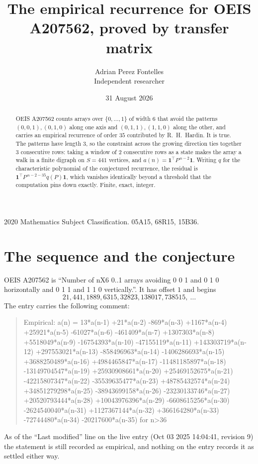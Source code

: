\documentclass[11pt,a4paper]{article}
\title{The empirical recurrence for OEIS A207562, proved by transfer matrix}
\author{Adrian Perez Fontelles\\ \small Independent researcher}
\date{31 August 2026}
\theoremstyle{plain}
\theoremstyle{definition}
\begin{document}
\maketitle

\begin{abstract}
OEIS A207562 counts arrays over $\{0,\dots,1\}$ of width $6$ that avoid the patterns
$(0,0,1), (0,1,0)$ along one axis and $(0,1,1), (1,1,0)$ along the other, and carries an empirical recurrence of
order $35$ contributed by R.~H.~Hardin. It is true. The patterns have length $3$, so
the constraint across the growing direction ties together $3$ consecutive rows: taking a
window of $2$ consecutive rows as a state makes the array a walk in a finite digraph
on $S=441$ vertices, and $a(n)=\mathbf{1}^{\!\top}P^{\,n-2}\mathbf{1}$. Writing $q$
for the characteristic polynomial of the conjectured recurrence, the residual is
$\mathbf{1}^{\!\top}P^{\,n-2-35}q(P)\mathbf{1}$, which vanishes identically
beyond a threshold that the computation pins down exactly. Finite, exact, integer.
\end{abstract}

\noindent\small 2020 Mathematics Subject Classification. 05A15, 68R15, 15B36.\normalsize

\section{The sequence and the conjecture}

OEIS A207562 is ``Number of nX6 0..1 arrays avoiding 0 0 1 and 0 1 0 horizontally and 0 1 1 and 1 1 0 vertically.''. It has offset
$1$ and begins
\[
21, 441, 1889, 6315, 32823, 138017, 738515,\ \dots
\]
The entry carries the following comment:
\begin{quote}\small
Empirical: a(n) = 13*a(n-1) +21*a(n-2) -869*a(n-3) +1167*a(n-4) +25921*a(n-5) -61027*a(n-6) -461409*a(n-7) +1307303*a(n-8) +5518049*a(n-9) -16754393*a(n-10) -47155119*a(n-11) +143303719*a(n-12) +297553021*a(n-13) -858496963*a(n-14) -1406286693*a(n-15) +3688250489*a(n-16) +4984465847*a(n-17) -11481185897*a(n-18) -13149704547*a(n-19) +25930908661*a(n-20) +25469152675*a(n-21) -42215807347*a(n-22) -35539635477*a(n-23) +48785432574*a(n-24) +34851279298*a(n-25) -38943699158*a(n-26) -23230133746*a(n-27) +20520793444*a(n-28) +10043976396*a(n-29) -6608615256*a(n-30) -2624540040*a(n-31) +1127367144*a(n-32) +366164280*a(n-33) -72744480*a(n-34) -20217600*a(n-35) for n>36
\end{quote}
As of the ``Last modified'' line on the live entry (Oct 03 2025 14:04:41, revision
9) the statement is still recorded as empirical, and nothing on the entry
records it as settled either way.
\end{document}
